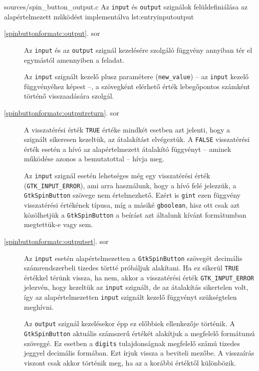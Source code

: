 {sources/spin_button_output.c}
{Az \texttt{input} és \texttt{output} szignálok felüldefiniálása az alapértelmezett működést implementálva}
{lst:entryinputoutput}

\begin{description}
 \item[\ref{spinbuttonformatc:output}. sor] Az \texttt{input} és az \texttt{output} szignál kezelésére szolgáló függvény annyiban tér el egymástól amennyiben a feladat.

Az \texttt{input} szignált kezelő plusz paramétere (\texttt{new\_value}) -- az \texttt{input} kezelő függvényéhez képest --, a szövegként elérhető érték lebegőpontos számként történő visszaadására szolgál.
 \item[\ref{spinbuttonformatc:outputreturn}. sor] A visszatérési érték \texttt{TRUE} értéke mindkét esetben azt jelenti, hogy a szignált sikeresen kezeltük, az átalakítást elvégeztük. A \texttt{FALSE} visszatérési érték esetén a hívó az alapértelmezett átalakító függvényt -- aminek működése azonos a bemutatottal -- hívja meg.

Az \texttt{input} szignál esetén lehetséges még egy visszatérési érték (\texttt{GTK\_INPUT\_ERROR}), ami arra használunk, hogy a hívó felé jelezzük, a \texttt{GtkSpinButton} szövege nem értelmezhető. Ezért is \texttt{gint} ezen függvény visszatérési értékének típusa, míg a másiké \texttt{gboolean}, hisz ott csak azt közölhetjük a \texttt{GtkSpinButton} a beírást azt általunk kívánt formátumban megtettük-e vagy sem.
 \item[\ref{spinbuttonformatc:outputset}. sor] Az \texttt{input} esetén alapértelmezetten a \texttt{GtkSpinButton} szövegét decimális számrendszerbeli tizedes törtté próbáljuk alakítani. Ha ez sikerül \texttt{TRUE} értékkel térünk vissza, ha nem, akkor a visszatérési érték \texttt{GTK\_INPUT\_ERROR} jelezvén, hogy kezeltük az \texttt{input} szignált, de az átalakítás sikertelen volt, így az alapértelmezetten \texttt{input} szignált kezelő függvényt szükségtelen meghívni.

Az \texttt{output} szignál kezelésekor épp ez előbbiek ellenkezője történik. A \texttt{GtkSpinButton} aktuális számszerű értékét alakítjuk a megfelelő formátumú szöveggé. Ez esetben a \texttt{digits} tulajdonságnak megfelelő számú tizedes jeggyel decimális formában. Ezt írjuk vissza a beviteli mezőbe. A visszaírás viszont csak akkor történik meg, ha az a korábbi értéktől különbözik.
\end{description}

